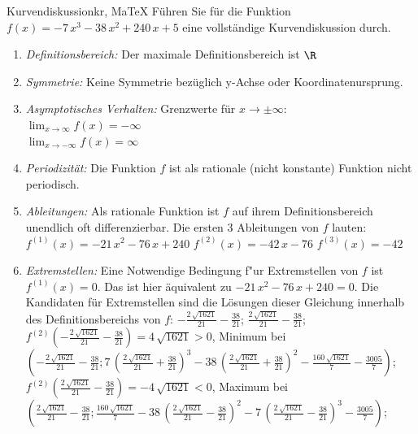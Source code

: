  \providecommand{\MoIl}{(} 
 \providecommand{\MoIr}{)}
 \providecommand{\MIntvlSep}{;} 
 \providecommand{\MElSetSep}{;} 
 \begin{MAufgabe}{Kurvendiskussion}{kr, MaTeX}
 F\"uhren Sie f\"ur die Funktion $f(x)= - 7\, x^3 - 38\, x^2 + 240\, x + 5$ eine vollst\"andige Kurvendiskussion durch.\\ 
 \ifLsg\Loesung
 \begin{enumerate}
 \item \emph{Definitionsbereich:} 
 Der maximale Definitionsbereich ist $\R$\item \emph{Symmetrie:} 
 Keine Symmetrie bez\"uglich y-Achse oder Koordinatenursprung.\item \emph{Asymptotisches Verhalten:} 
 Grenzwerte f\"ur $x\rightarrow \pm \infty$: \\ 
 $\lim_{x\rightarrow \infty} f(x)=- \infty$ \\ 
 $\lim_{x\rightarrow -\infty} f(x)=\infty$ \\ 
 \item \emph{Periodizit\"at:} 
 Die Funktion $f$ ist als rationale (nicht konstante) Funktion nicht periodisch.\item \emph{Ableitungen:} 
 Als rationale Funktion ist $f$ auf ihrem Definitionsbereich unendlich oft differenzierbar. 
 Die ersten 3 Ableitungen von $f$ lauten: \\ 
 $f^{(1)}(x)= - 21\, x^2 - 76\, x + 240$\newline 
  $f^{(2)}(x)= - 42\, x - 76$\newline 
  $f^{(3)}(x)=-42$\newline 
  \item \emph{Extremstellen:} 
 Eine Notwendige Bedingung f"ur Extremstellen von $f$ ist $f^{(1)}(x)=0$. 
 Das ist hier \"aquivalent zu $ - 21\, x^2 - 76\, x + 240=0$. 
 Die Kandidaten f\"ur Extremstellen sind die L\"osungen dieser Gleichung innerhalb des Definitionsbereichs von $f$: $ - \frac{2\, \sqrt{1621}}{21} - \frac{38}{21}$; $\frac{2\, \sqrt{1621}}{21} - \frac{38}{21}$; \\ 
 $f^{(2)}( - \frac{2\, \sqrt{1621}}{21} - \frac{38}{21})=4\, \sqrt{1621}$$>0$, Minimum bei $( - \frac{2\, \sqrt{1621}}{21} - \frac{38}{21};7\, {\left(\frac{2\, \sqrt{1621}}{21} + \frac{38}{21}\right)}^3 - 38\, {\left(\frac{2\, \sqrt{1621}}{21} + \frac{38}{21}\right)}^2 - \frac{160\, \sqrt{1621}}{7} - \frac{3005}{7})$; \\ 
 $f^{(2)}(\frac{2\, \sqrt{1621}}{21} - \frac{38}{21})=- 4\, \sqrt{1621}$$<0$, Maximum bei $(\frac{2\, \sqrt{1621}}{21} - \frac{38}{21};\frac{160\, \sqrt{1621}}{7} - 38\, {\left(\frac{2\, \sqrt{1621}}{21} - \frac{38}{21}\right)}^2 - 7\, {\left(\frac{2\, \sqrt{1621}}{21} - \frac{38}{21}\right)}^3 - \frac{3005}{7})$; \\ 

\end{enumerate}
\end{MAufgabe}
